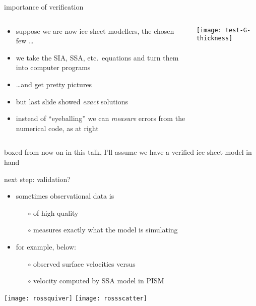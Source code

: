 \documentclass[hide notes,intlimits]{beamer}
\begin{document}
\begin{frame}{importance of verification}

\begin{columns}
\begin{column}{0.45\textwidth}
\small
\begin{itemize}
\item suppose we are now \alert{ice sheet modellers}, the chosen few \dots
\item we take the SIA, SSA, etc.~equations and turn them into computer programs
\item \dots and get pretty pictures
\bigskip

\item but last slide showed \emph{exact} solutions
\item instead of ``eyeballing'' we can \emph{measure} errors from the numerical code, as at right
\end{itemize}
\end{column}

\begin{column}{0.55\textwidth}
\begin{center}
\texttt{[image: test-G-thickness]}
\end{center}
\end{column}
\end{columns}

\bigskip
\begin{beamercolorbox}[shadow=true,rounded=true]{boxed} \centering\small
    from now on in this talk, I'll assume we have a verified ice sheet model in hand
\end{beamercolorbox}
\end{frame}


\begin{frame}{next step: validation?}

\begin{itemize}
\small

\item sometimes observational data is 
  \begin{itemize}
  \item[$\circ$] of high quality
  \item[$\circ$] measures exactly what the model is simulating
  \end{itemize}
\item for example, below:
  \begin{itemize}
  \item[$\circ$] observed surface velocities versus
  \item[$\circ$] velocity computed by SSA model in PISM
  \end{itemize}
\end{itemize}

\begin{center}
  \texttt{[image: rossquiver]} \quad  \texttt{[image: rossscatter]}
\end{center}
\end{frame}
\end{document}
